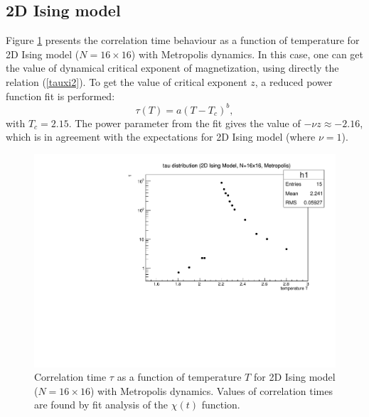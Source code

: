 \documentclass[11pt,a4paper]{article}%
\begin{document}
\clearpage
\subsection{2D Ising model} 
Figure \ref{T_vs_tau_2d} presents the correlation time behaviour as a function of temperature for 2D Ising model ($N=16\times16$) with Metropolis dynamics. 
In this case, one can get the value of dynamical critical exponent of magnetization, using directly the relation (\ref{tauxi2}). To get the value of critical exponent $z$, a reduced power function fit is performed:
\begin{equation}
\tau(T)=a(T-T_c)^b ,
\end{equation}
with $T_c=2.15$.
 The power parameter from the fit gives the value of $-\nu z \approx -2.16$, which is in agreement with the expectations for 2D Ising model (where $\nu=1$).

\begin{figure}[!ht]
\centering
  \includegraphics[scale=0.6]{IsingTestTCorr_T_vs_tau_log_2D.pdf}
  \vspace{-0.05in}
   \caption[]{Correlation time $\tau$ as a function of temperature $T$ for 2D Ising model ($N=16\times16$) with Metropolis dynamics. Values of correlation times are found by fit analysis of the $\chi(t)$ function.}   
  \label{T_vs_tau_2d}
\end{figure}
\end{document}
